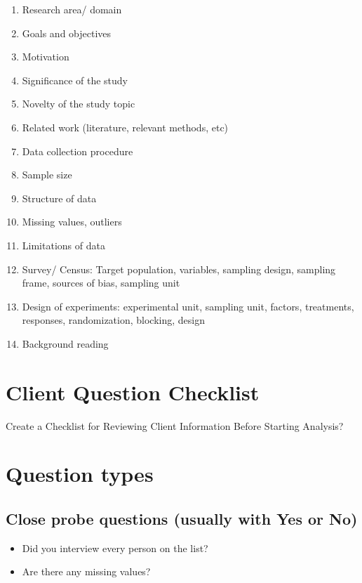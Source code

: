 \documentclass[
  letterpaper,
  DIV=11,
  numbers=noendperiod]{scrreprt}
\begin{document}
\begin{enumerate}
\def\labelenumi{\arabic{enumi}.}
\item
  Research area/ domain
\item
  Goals and objectives
\item
  Motivation
\item
  Significance of the study
\item
  Novelty of the study topic
\item
  Related work (literature, relevant methods, etc)
\item
  Data collection procedure
\item
  Sample size
\item
  Structure of data
\item
  Missing values, outliers
\item
  Limitations of data
\item
  Survey/ Census: Target population, variables, sampling design,
  sampling frame, sources of bias, sampling unit
\item
  Design of experiments: experimental unit, sampling unit, factors,
  treatments, responses, randomization, blocking, design
\item
  Background reading
\end{enumerate}

\section{Client Question Checklist}\label{client-question-checklist}

Create a Checklist for Reviewing Client Information Before Starting
Analysis?

\section{Question types}\label{question-types}

\subsection{Close probe questions (usually with Yes or
No)}\label{close-probe-questions-usually-with-yes-or-no}

\begin{itemize}
\item
  Did you interview every person on the list?
\item
  Are there any missing values?
\end{itemize}
\end{document}
